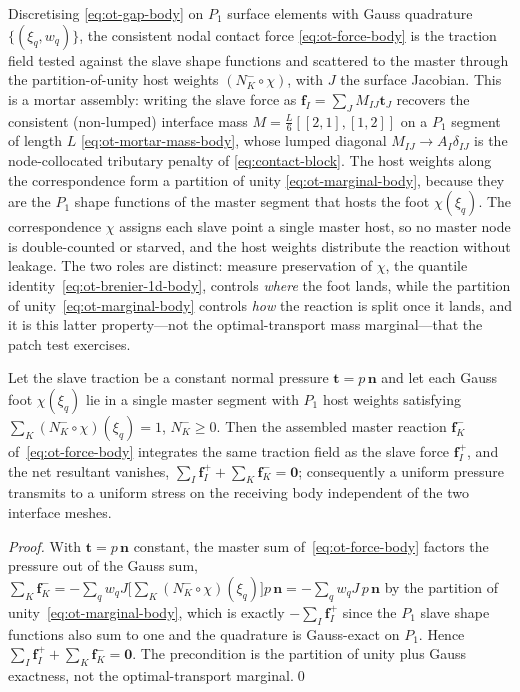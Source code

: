 \documentclass{svjour3}                 %
\newcommand{\nbf}{\bm{n}}
\newcommand{\tbf}{\bm{t}}
\newcommand{\fbf}{\bm{f}}
\begin{document}
Discretising \eqref{eq:ot-gap-body} on $P_1$ surface elements with Gauss quadrature $\{(\xi_q,w_q)\}$, the
consistent nodal contact force \eqref{eq:ot-force-body} is the traction field tested against the slave shape
functions and scattered to the master through the partition-of-unity host weights $(N_K^-\!\circ\chi)$, with $J$
the surface Jacobian. This is a mortar assembly: writing the slave force as $\fbf_I=\sum_J M_{IJ}\tbf_J$
recovers the consistent (non-lumped) interface mass $M=\tfrac{L}{6}[[2,1],[1,2]]$ on a $P_1$ segment of length
$L$ \eqref{eq:ot-mortar-mass-body}, whose lumped diagonal $M_{IJ}\to A_I\delta_{IJ}$ is the node-collocated
tributary penalty of \eqref{eq:contact-block}. The host weights along the correspondence form a partition of
unity \eqref{eq:ot-marginal-body},
because they are the $P_1$ shape functions of the master segment that hosts the foot $\chi(\xi_q)$. The
correspondence $\chi$ assigns each slave point a single master host, so no master node is double-counted or
starved, and the host weights distribute the reaction without leakage. The two roles are distinct: measure
preservation of $\chi$, the quantile identity~\eqref{eq:ot-brenier-1d-body}, controls \emph{where} the foot lands,
while the partition of unity~\eqref{eq:ot-marginal-body} controls \emph{how} the reaction is split once it lands, and
it is this latter property---not the optimal-transport mass marginal---that the patch test exercises.

\begin{proposition}\label{prop:patch}
Let the slave traction be a constant normal pressure $\tbf=p\,\nbf$ and let each Gauss foot $\chi(\xi_q)$ lie in a
single master segment with $P_1$ host weights satisfying $\sum_K(N_K^-\!\circ\chi)(\xi_q)=1$, $N_K^-\ge0$. Then
the assembled master reaction $\fbf_K^-$ of~\eqref{eq:ot-force-body} integrates the same traction field as the slave
force $\fbf_I^+$, and the net resultant vanishes, $\sum_I\fbf_I^+ + \sum_K\fbf_K^-=\bm0$; consequently a uniform
pressure transmits to a uniform stress on the receiving body independent of the two interface meshes.
\end{proposition}
\begin{proof}
With $\tbf=p\,\nbf$ constant, the master sum of~\eqref{eq:ot-force-body} factors the pressure out of the Gauss sum,
$\sum_K\fbf_K^-=-\sum_q w_q J\big[\sum_K(N_K^-\!\circ\chi)(\xi_q)\big]p\,\nbf=-\sum_q w_q J\,p\,\nbf$ by the
partition of unity~\eqref{eq:ot-marginal-body}, which is exactly $-\sum_I\fbf_I^+$ since the $P_1$ slave shape functions
also sum to one and the quadrature is Gauss-exact on $P_1$. Hence $\sum_I\fbf_I^++\sum_K\fbf_K^-=\bm0$. The
precondition is the partition of unity plus Gauss exactness, not the optimal-transport marginal.\qed
\end{proof}
\end{document}
